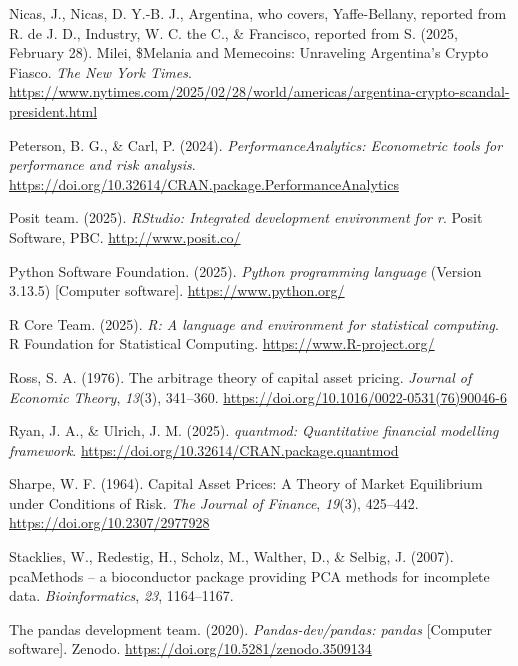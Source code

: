 \documentclass[
  12pt,
  a4paper,
  openany]{scrbook}
\newlength{\cslhangindent}
\newenvironment{CSLReferences}[2] %
 {\begin{list}{}{%
  \setlength{\itemindent}{0pt}
  \setlength{\leftmargin}{0pt}
  \setlength{\parsep}{0pt}
  \ifodd #1
   \setlength{\leftmargin}{\cslhangindent}
   \setlength{\itemindent}{-1\cslhangindent}
  \fi
  \setlength{\itemsep}{#2\baselineskip}}}
 {\end{list}}
\begin{document}
\begin{CSLReferences}{1}{0}
Nicas, J., Nicas, D. Y.-B. J., Argentina, who covers, Yaffe-Bellany,
reported from R. de J. D., Industry, W. C. the C., \& Francisco,
reported from S. (2025, February 28). Milei, \$Melania and Memecoins:
Unraveling Argentina's Crypto Fiasco. \emph{The New York Times}.
\url{https://www.nytimes.com/2025/02/28/world/americas/argentina-crypto-scandal-president.html}

Peterson, B. G., \& Carl, P. (2024). \emph{{PerformanceAnalytics}:
Econometric tools for performance and risk analysis}.
\url{https://doi.org/10.32614/CRAN.package.PerformanceAnalytics}

Posit team. (2025). \emph{{RStudio}: Integrated development environment
for r}. Posit Software, PBC. \url{http://www.posit.co/}

Python Software Foundation. (2025). \emph{Python programming language}
(Version 3.13.5) {[}Computer software{]}. \url{https://www.python.org/}

R Core Team. (2025). \emph{R: A language and environment for statistical
computing}. R Foundation for Statistical Computing.
\url{https://www.R-project.org/}

Ross, S. A. (1976). The arbitrage theory of capital asset pricing.
\emph{Journal of Economic Theory}, \emph{13}(3), 341--360.
\url{https://doi.org/10.1016/0022-0531(76)90046-6}

Ryan, J. A., \& Ulrich, J. M. (2025). \emph{{quantmod}: Quantitative
financial modelling framework}.
\url{https://doi.org/10.32614/CRAN.package.quantmod}

Sharpe, W. F. (1964). Capital Asset Prices: A Theory of Market
Equilibrium under Conditions of Risk. \emph{The Journal of Finance},
\emph{19}(3), 425--442. \url{https://doi.org/10.2307/2977928}

Stacklies, W., Redestig, H., Scholz, M., Walther, D., \& Selbig, J.
(2007). pcaMethods -- a bioconductor package providing PCA methods for
incomplete data. \emph{Bioinformatics}, \emph{23}, 1164--1167.

The pandas development team. (2020). \emph{Pandas-dev/pandas: pandas}
{[}Computer software{]}. Zenodo.
\url{https://doi.org/10.5281/zenodo.3509134}


\end{CSLReferences}
\end{document}
